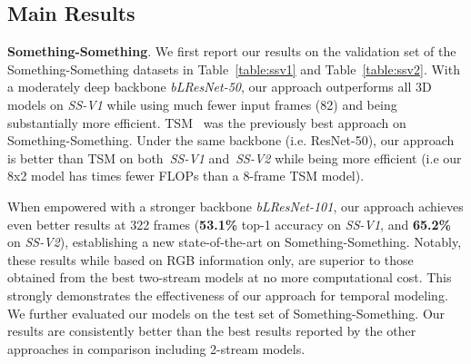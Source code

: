 \documentclass{article}
\def\SSVone{\textit{SS-V1}\xspace}
\def\SSVtwo{\textit{SS-V2}\xspace}
\begin{document}
\subsection{Main Results}
\textbf{Something-Something}. We first report our results on the validation set of the Something-Something datasets in Table~\ref{table:ssv1} and Table~\ref{table:ssv2}. 
With a moderately deep backbone \textit{bLResNet-50}, our approach outperforms all 3D models on \SSVone while using much fewer input frames (82) and being substantially more efficient. TSM~\cite{TSM:lin2018temporal} was the previously best approach on Something-Something. Under the same backbone (i.e. ResNet-50), our approach is better than TSM on both~\SSVone and~\SSVtwo while being more efficient (i.e our 8x2 model has  times fewer FLOPs than a 8-frame TSM model). 

When empowered with a stronger backbone \textit{bLResNet-101}, our approach achieves even better results at 322 frames (\textbf{53.1\%} top-1 accuracy on \SSVone, and \textbf{65.2\%} on \SSVtwo), establishing a new state-of-the-art on Something-Something. Notably, these results while based on RGB information only, are superior to those obtained from the best two-stream models at no more computational cost. This strongly demonstrates the effectiveness of our approach for temporal modeling.
We further evaluated our models on the test set of Something-Something. Our results are consistently better than the best results reported by the other approaches in comparison including 2-stream models. 
\end{document}
